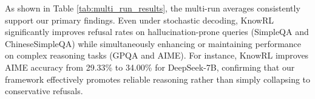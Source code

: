 

As shown in Table \ref{tab:multi_run_results}, the multi-run averages consistently support our primary findings.
Even under stochastic decoding, KnowRL significantly improves refusal rates on hallucination-prone queries (SimpleQA and ChineseSimpleQA) while simultaneously enhancing or maintaining performance on complex reasoning tasks (GPQA and AIME).
For instance, KnowRL improves AIME accuracy from 29.33\% to 34.00\% for DeepSeek-7B, confirming that our framework effectively promotes reliable reasoning rather than simply collapsing to conservative refusals.















   
       

